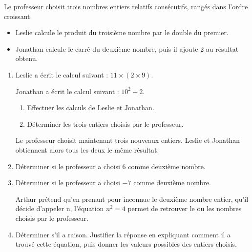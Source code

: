 \begin{exercice*}
    \begin{myBox}{}
        Le professeur choisit trois nombres entiers relatifs consécutifs, rangés dans l’ordre croissant.
        \begin{itemize}
            \item Leslie calcule le produit du troisième nombre par le double du premier.
            \item Jonathan calcule le carré du deuxième nombre, puis il ajoute 2 au résultat obtenu.
        \end{itemize}
    \end{myBox}
    \begin{enumerate}
        \item Leslie a écrit le calcul suivant : $11\times (2 \times 9)$.
        
        Jonathan a écrit le calcul suivant : $10^2+2$.
        \begin{enumerate}
            \item Effectuer les calculs de Leslie et Jonathan.
            \item Déterminer les trois entiers choisis par le professeur.
        \end{enumerate}
    \begin{myBox}{}
        Le professeur choisit maintenant trois nouveaux entiers. Leslie et Jonathan obtiennent alors tous les deux le même résultat.
    \end{myBox}
    \item Déterminer si le professeur a choisi $6$ comme deuxième nombre.
    \item Déterminer si le professeur a choisi $-7$ comme deuxième nombre.
    \begin{myBox}{}
        Arthur prétend qu'en prenant pour inconnue le deuxième nombre entier, qu'il décide d'appeler n,
        l'équation $n^2 = 4$ permet de retrouver le ou les nombres choisis par le professeur.
    \end{myBox}
    \item Déterminer s'il a raison. Justifier la réponse en expliquant comment il a trouvé cette équation, puis donner les valeurs possibles des entiers choisis.
    \end{enumerate}
\end{exercice*}
